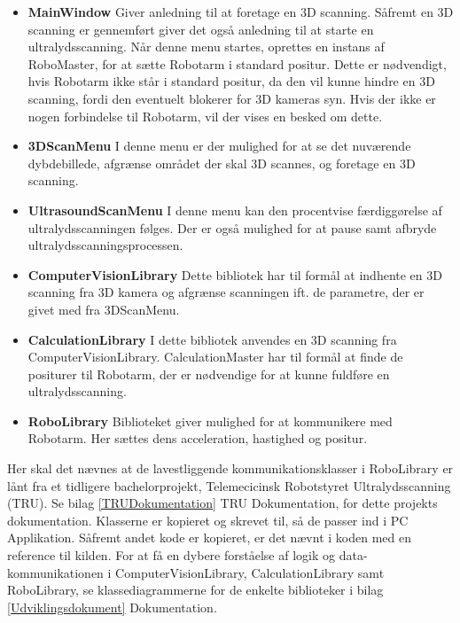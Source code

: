 \let\labelitemi\labelitemii
\begin{itemize}
\item\textbf{{MainWindow}}\newline
Giver anledning til at foretage en 3D scanning. Såfremt en 3D scanning er gennemført giver det også anledning til at starte en ultralydsscanning. Når denne menu startes, oprettes en instans af RoboMaster, for at sætte Robotarm i standard positur. Dette er nødvendigt, hvis Robotarm ikke står i standard positur, da den vil kunne hindre en 3D scanning, fordi den eventuelt blokerer for 3D kameras syn.
Hvis der ikke er nogen forbindelse til Robotarm, vil der vises en besked om dette.

\item\textbf{{3DScanMenu}}\newline
I denne menu er der mulighed for at se det nuværende dybdebillede, afgrænse området der skal 3D scannes, og foretage en 3D scanning.

\item\textbf{{UltrasoundScanMenu}}\newline
I denne menu kan den procentvise færdiggørelse af ultralydsscanningen følges. Der er også mulighed for at pause samt afbryde ultralydsscanningsprocessen.

\item\textbf{{ComputerVisionLibrary}}\newline
Dette bibliotek har til formål at indhente en 3D scanning fra 3D kamera og afgrænse scanningen ift. de parametre, der er givet med fra 3DScanMenu.

\item\textbf{{CalculationLibrary}}\newline
I dette bibliotek anvendes en 3D scanning fra ComputerVisionLibrary. CalculationMaster har til formål at finde de positurer til Robotarm, der er nødvendige for at kunne fuldføre en ultralydsscanning.

\item\textbf{{RoboLibrary}}\newline
Biblioteket giver mulighed for at kommunikere med Robotarm. Her sættes dens acceleration, hastighed og positur.
\end{itemize}

Her skal det nævnes at de lavestliggende kommunikationsklasser i RoboLibrary er lånt fra et tidligere bachelorprojekt, Telemecicinsk Robotstyret Ultralydsscanning (TRU). Se bilag \ref{TRUDokumentation} TRU Dokumentation, for dette projekts dokumentation. Klasserne er kopieret og skrevet til, så de passer ind i PC Applikation. Såfremt andet kode er kopieret, er det nævnt i koden med en reference til kilden.
For at få en dybere forståelse af logik og data-kommunikationen i ComputerVisionLibrary, CalculationLibrary samt RoboLibrary, se klassediagrammerne for de enkelte biblioteker i bilag \ref{Udviklingsdokument} Dokumentation. 
\newpage

